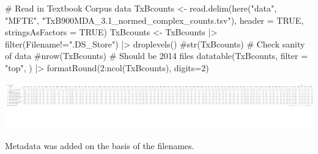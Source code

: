 \documentclass[
  letterpaper,
  DIV=11,
  numbers=noendperiod]{scrreprt}
\newenvironment{Shaded}{\begin{snugshade}}{\end{snugshade}}
\newcommand{\AttributeTok}[1]{\textcolor[rgb]{0.40,0.45,0.13}{#1}}
\newcommand{\CommentTok}[1]{\textcolor[rgb]{0.37,0.37,0.37}{#1}}
\newcommand{\ConstantTok}[1]{\textcolor[rgb]{0.56,0.35,0.01}{#1}}
\newcommand{\DecValTok}[1]{\textcolor[rgb]{0.68,0.00,0.00}{#1}}
\newcommand{\FunctionTok}[1]{\textcolor[rgb]{0.28,0.35,0.67}{#1}}
\newcommand{\NormalTok}[1]{\textcolor[rgb]{0.00,0.23,0.31}{#1}}
\newcommand{\OtherTok}[1]{\textcolor[rgb]{0.00,0.23,0.31}{#1}}
\newcommand{\SpecialCharTok}[1]{\textcolor[rgb]{0.37,0.37,0.37}{#1}}
\newcommand{\StringTok}[1]{\textcolor[rgb]{0.13,0.47,0.30}{#1}}
\begin{document}
\begin{Shaded}
\begin{Highlighting}[]
\CommentTok{\# Read in Textbook Corpus data}
\NormalTok{TxBcounts }\OtherTok{\textless{}{-}} \FunctionTok{read.delim}\NormalTok{(}\FunctionTok{here}\NormalTok{(}\StringTok{"data"}\NormalTok{, }\StringTok{"MFTE"}\NormalTok{, }\StringTok{"TxB900MDA\_3.1\_normed\_complex\_counts.tsv"}\NormalTok{), }\AttributeTok{header =} \ConstantTok{TRUE}\NormalTok{, }\AttributeTok{stringsAsFactors =} \ConstantTok{TRUE}\NormalTok{)}
\NormalTok{TxBcounts }\OtherTok{\textless{}{-}}\NormalTok{ TxBcounts }\SpecialCharTok{|\textgreater{}} 
  \FunctionTok{filter}\NormalTok{(Filename}\SpecialCharTok{!=}\StringTok{".DS\_Store"}\NormalTok{) }\SpecialCharTok{|\textgreater{}}  
  \FunctionTok{droplevels}\NormalTok{()}
\CommentTok{\#str(TxBcounts) \# Check sanity of data}
\CommentTok{\#nrow(TxBcounts) \# Should be 2014 files}
\FunctionTok{datatable}\NormalTok{(TxBcounts,}
  \AttributeTok{filter =} \StringTok{"top"}\NormalTok{,}
\NormalTok{) }\SpecialCharTok{|\textgreater{}} 
  \FunctionTok{formatRound}\NormalTok{(}\DecValTok{2}\SpecialCharTok{:}\FunctionTok{ncol}\NormalTok{(TxBcounts), }\AttributeTok{digits=}\DecValTok{2}\NormalTok{)}
\end{Highlighting}
\end{Shaded}

\includegraphics{D_Ch6_DataPrep_files/figure-pdf/raw_data-1.pdf}

Metadata was added on the basis of the filenames.

\begin{Shaded}
\end{Shaded}
\end{document}

